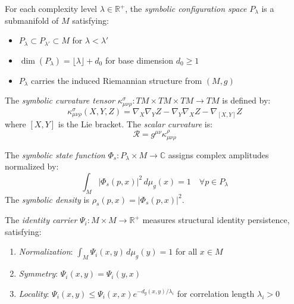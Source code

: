 \begin{definition}
\label{definition:bk6_symbolic_configuration_spaces}
For each complexity level $\lambda \in \mathbb{R}^+$, the \emph{symbolic configuration space} $P_\lambda$ is a submanifold of $M$ satisfying:
\begin{itemize}
\item $P_\lambda \subset P_{\lambda'} \subset M$ for $\lambda < \lambda'$
\item $\dim(P_\lambda) = \lfloor \lambda \rfloor + d_0$ for base dimension $d_0 \geq 1$
\item $P_\lambda$ carries the induced Riemannian structure from $(M,g)$
\end{itemize}
\end{definition}

\begin{definition}
\label{definition:bk6_symbolic_curvature_tensor_coordinate_index}
The \emph{symbolic curvature tensor} $\kappa_{\mu\nu\rho}^\sigma : TM \times TM \times TM \to TM$ is defined by:
\begin{equation}
\kappa_{\mu\nu\rho}^\sigma(X,Y,Z) = \nabla_X \nabla_Y Z - \nabla_Y \nabla_X Z - \nabla_{[X,Y]} Z
\end{equation}
where $[X,Y]$ is the Lie bracket. The \emph{scalar curvature} is:
\begin{equation}
\mathcal{R} = g^{\mu\nu} \kappa_{\mu\nu\rho}^\rho
\end{equation}
\end{definition}

\begin{definition}
\label{definition:bk6_symbolic_state_function_complete}
The \emph{symbolic state function} $\Phi_s : P_\lambda \times M \to \mathbb{C}$ assigns complex amplitudes normalized by:
\begin{equation}
\int_M |\Phi_s(p,x)|^2 \, d\mu_g(x) = 1 \quad \forall p \in P_\lambda
\end{equation}
The \emph{symbolic density} is $\rho_s(p,x) = |\Phi_s(p,x)|^2$.
\end{definition}

\begin{definition}
\label{definition:bk6_identity_carrier_kernel}
The \emph{identity carrier} $\Psi_i : M \times M \to \mathbb{R}^+$ measures structural identity persistence, satisfying:
\begin{enumerate}
\item \emph{Normalization}: $\int_M \Psi_i(x, y) \, d\mu_g(y) = 1$ for all $x \in M$
\item \emph{Symmetry}: $\Psi_i(x, y) = \Psi_i(y, x)$
\item \emph{Locality}: $\Psi_i(x, y) \leq \Psi_i(x, x)e^{-d_g(x,y)/\lambda_i}$ for correlation length $\lambda_i > 0$
\end{enumerate}
\end{definition}

